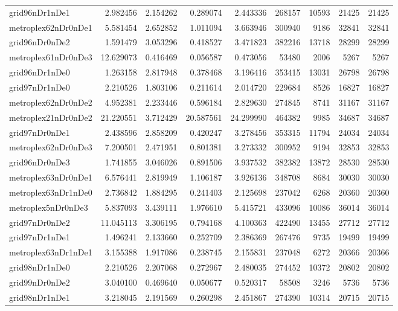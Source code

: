 \documentclass[../../../thesis.tex]{subfiles}
\begin{document}
\begin{longtable}{|l|r|r|r|r|r|r|r|r|}
grid96nDr1nDe1 & 2.982456 & 2.154262 & 0.289074 & 2.443336 & 268157 & 10593 & 21425 & 21425 \\
metroplex62nDr0nDe1 & 5.581454 & 2.652852 & 1.011094 & 3.663946 & 300940 & 9186 & 32841 & 32841 \\
grid96nDr0nDe2 & 1.591479 & 3.053296 & 0.418527 & 3.471823 & 382216 & 13718 & 28299 & 28299 \\
metroplex61nDr0nDe3 & 12.629073 & 0.416469 & 0.056587 & 0.473056 & 53480 & 2006 & 5267 & 5267 \\
grid96nDr1nDe0 & 1.263158 & 2.817948 & 0.378468 & 3.196416 & 353415 & 13031 & 26798 & 26798 \\
grid97nDr1nDe0 & 2.210526 & 1.803106 & 0.211614 & 2.014720 & 229684 & 8526 & 16827 & 16827 \\
metroplex62nDr0nDe2 & 4.952381 & 2.233446 & 0.596184 & 2.829630 & 274845 & 8741 & 31167 & 31167 \\
metroplex21nDr0nDe2 & 21.220551 & 3.712429 & 20.587561 & 24.299990 & 464382 & 9985 & 34687 & 34687 \\
grid97nDr0nDe1 & 2.438596 & 2.858209 & 0.420247 & 3.278456 & 353315 & 11794 & 24034 & 24034 \\
metroplex62nDr0nDe3 & 7.200501 & 2.471951 & 0.801381 & 3.273332 & 300952 & 9194 & 32853 & 32853 \\
grid96nDr0nDe3 & 1.741855 & 3.046026 & 0.891506 & 3.937532 & 382382 & 13872 & 28530 & 28530 \\
metroplex63nDr0nDe1 & 6.576441 & 2.819949 & 1.106187 & 3.926136 & 348708 & 8684 & 30030 & 30030 \\
metroplex63nDr1nDe0 & 2.736842 & 1.884295 & 0.241403 & 2.125698 & 237042 & 6268 & 20360 & 20360 \\
metroplex5nDr0nDe3 & 5.837093 & 3.439111 & 1.976610 & 5.415721 & 433096 & 10086 & 36014 & 36014 \\
grid97nDr0nDe2 & 11.045113 & 3.306195 & 0.794168 & 4.100363 & 422490 & 13455 & 27712 & 27712 \\
grid97nDr1nDe1 & 1.496241 & 2.133660 & 0.252709 & 2.386369 & 267476 & 9735 & 19499 & 19499 \\
metroplex63nDr1nDe1 & 3.155388 & 1.917086 & 0.238745 & 2.155831 & 237048 & 6272 & 20366 & 20366 \\
grid98nDr1nDe0 & 2.210526 & 2.207068 & 0.272967 & 2.480035 & 274452 & 10372 & 20802 & 20802 \\
grid99nDr0nDe2 & 3.040100 & 0.469640 & 0.050677 & 0.520317 & 58508 & 3246 & 5736 & 5736 \\
grid98nDr1nDe1 & 3.218045 & 2.191569 & 0.260298 & 2.451867 & 274390 & 10314 & 20715 & 20715 \\

\end{longtable}
\end{document}

